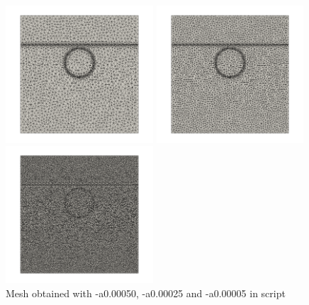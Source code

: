 \begin{center}
\includegraphics[width=5.5cm]{python_codes/fieldstone_93/results/mesh1}
\includegraphics[width=5.5cm]{python_codes/fieldstone_93/results/mesh2}
\includegraphics[width=5.5cm]{python_codes/fieldstone_93/results/mesh3}\\
{\captionfont  Mesh obtained with -a0.00050, -a0.00025 and -a0.00005 in script}
\end{center}

